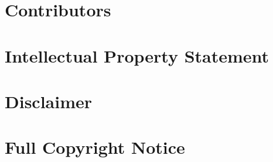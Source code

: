 \documentclass[10pt,a4paper]{article}
\begin{document}
\section{Contributors}
\label{sec:contrib}


\section{Intellectual Property Statement}
\label{sec:ips}


\section{Disclaimer}
\label{sec:disclaim}


\section{Full Copyright Notice}
\label{sec:copy}




\end{document}
